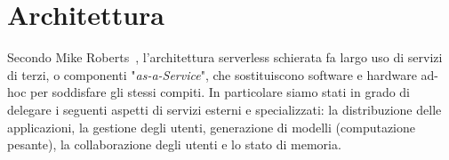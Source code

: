 \section{Architettura}
\label{sec:chapter_2_section_1}

Secondo Mike Roberts~\cite{Roberts}, l'architettura serverless schierata fa largo uso di servizi di terzi,
o componenti "\emph{as-a-Service}", che sostituiscono software e hardware ad-hoc per soddisfare gli stessi compiti.
In particolare siamo stati in grado di delegare i seguenti aspetti di servizi esterni e specializzati:
la distribuzione delle applicazioni, la gestione degli utenti, generazione di modelli (computazione pesante),
la collaborazione degli utenti e lo stato di memoria.

